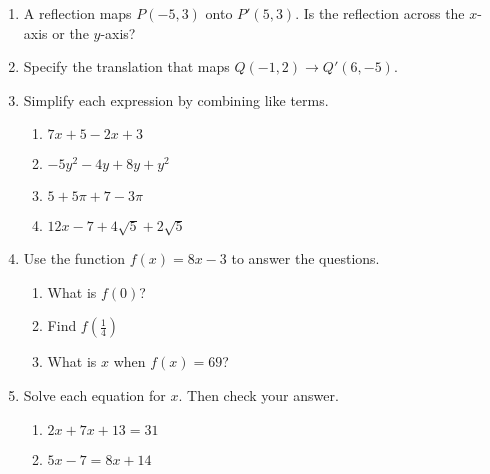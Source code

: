 \documentclass[12pt, twoside]{article}
\begin{document}
\begin{enumerate}[itemsep=0.5cm]
\item A reflection maps $P(-5,3)$ onto $P'(5,3)$. Is the reflection across the $x$-axis or the $y$-axis? \vspace{2cm}

\item Specify the translation that maps $Q(-1,2)\rightarrow Q'(6,-5)$.


\newpage
\item Simplify each expression by combining like terms.
  \begin{multicols}{2}
      \begin{enumerate}[itemsep=1.5cm]
        \item $7x+5-2x+3$
        \item $-5y^2-4y+8y+y^2$
        \item $5+5\pi+7-3\pi$
        \item $12x-7+4\sqrt{5}+2\sqrt{5}$
      \end{enumerate}
  \end{multicols} \vspace{1cm}

\item Use the function $f(x) = 8x-3$ to answer the questions.
  \begin{multicols}{2}
  \begin{enumerate}[itemsep=2cm]
      \item What is $f(0)$?
      \item Find $f(\frac{1}{4})$
      \item What is $x$ when $f(x) = 69$?
  \end{enumerate}
  \end{multicols} \vspace{2cm}

\item Solve each equation for $x$. Then check your answer.
  \begin{multicols}{2}
    \begin{enumerate}[itemsep=1cm]
  \item $2x+7x+13=31$
  \item $5x-7=8x+14$
  \end{enumerate}
  \end{multicols}



\end{enumerate}
\end{document}
